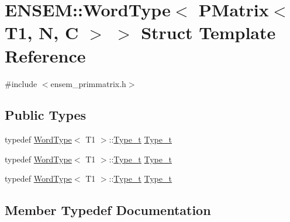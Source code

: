 \hypertarget{structENSEM_1_1WordType_3_01PMatrix_3_01T1_00_01N_00_01C_01_4_01_4}{}\section{E\+N\+S\+EM\+:\+:Word\+Type$<$ P\+Matrix$<$ T1, N, C $>$ $>$ Struct Template Reference}
\label{structENSEM_1_1WordType_3_01PMatrix_3_01T1_00_01N_00_01C_01_4_01_4}


{\ttfamily \#include $<$ensem\+\_\+primmatrix.\+h$>$}

\subsection*{Public Types}
\begin{DoxyCompactItemize}
\item 
typedef \mbox{\hyperlink{structENSEM_1_1WordType}{Word\+Type}}$<$ T1 $>$\+::\mbox{\hyperlink{structENSEM_1_1WordType_3_01PMatrix_3_01T1_00_01N_00_01C_01_4_01_4_a892bcf86195d7872e78b5a8b6a1e1734}{Type\+\_\+t}} \mbox{\hyperlink{structENSEM_1_1WordType_3_01PMatrix_3_01T1_00_01N_00_01C_01_4_01_4_a892bcf86195d7872e78b5a8b6a1e1734}{Type\+\_\+t}}
\item 
typedef \mbox{\hyperlink{structENSEM_1_1WordType}{Word\+Type}}$<$ T1 $>$\+::\mbox{\hyperlink{structENSEM_1_1WordType_3_01PMatrix_3_01T1_00_01N_00_01C_01_4_01_4_a892bcf86195d7872e78b5a8b6a1e1734}{Type\+\_\+t}} \mbox{\hyperlink{structENSEM_1_1WordType_3_01PMatrix_3_01T1_00_01N_00_01C_01_4_01_4_a892bcf86195d7872e78b5a8b6a1e1734}{Type\+\_\+t}}
\item 
typedef \mbox{\hyperlink{structENSEM_1_1WordType}{Word\+Type}}$<$ T1 $>$\+::\mbox{\hyperlink{structENSEM_1_1WordType_3_01PMatrix_3_01T1_00_01N_00_01C_01_4_01_4_a892bcf86195d7872e78b5a8b6a1e1734}{Type\+\_\+t}} \mbox{\hyperlink{structENSEM_1_1WordType_3_01PMatrix_3_01T1_00_01N_00_01C_01_4_01_4_a892bcf86195d7872e78b5a8b6a1e1734}{Type\+\_\+t}}
\end{DoxyCompactItemize}


\subsection{Member Typedef Documentation}
\mbox{\label{structENSEM_1_1WordType_3_01PMatrix_3_01T1_00_01N_00_01C_01_4_01_4_a892bcf86195d7872e78b5a8b6a1e1734}} 
